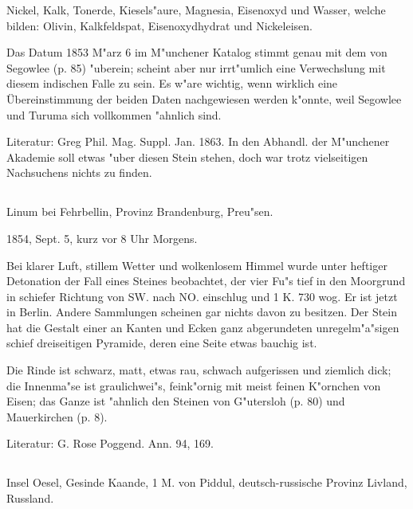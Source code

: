 \documentclass[a4paper, 11pt, oneside]{article}
\begin{document}
Nickel, Kalk, Tonerde, Kiesels"aure, Magnesia, Eisenoxyd und Wasser, welche bilden: Olivin, Kalkfeldspat, Eisenoxydhydrat und Nickeleisen.

Das Datum 1853 M"arz 6 im M"unchener Katalog stimmt genau mit dem von Segowlee (p. 85) "uberein; scheint aber nur irrt"umlich eine Verwechslung mit diesem indischen Falle zu sein. Es w"are wichtig, wenn wirklich eine Übereinstimmung der beiden Daten nachgewiesen werden k"onnte, weil Segowlee und Turuma sich vollkommen "ahnlich sind.

\normalsize
Literatur: Greg Phil. Mag. Suppl. Jan. 1863. In den Abhandl. der M"unchener Akademie soll etwas "uber diesen Stein stehen, doch war trotz vielseitigen Nachsuchens nichts zu finden.

\subsection{}
\LARGE
\paragraph{}
Linum bei Fehrbellin, Provinz Brandenburg, Preu"sen.

1854, Sept. 5, kurz vor 8 Uhr Morgens.

Bei klarer Luft, stillem Wetter und wolkenlosem Himmel wurde unter heftiger Detonation der Fall eines Steines beobachtet, der vier Fu"s tief in den Moorgrund in schiefer Richtung von SW. nach NO. einschlug und 1 K. 730 wog. Er ist jetzt in Berlin. Andere Sammlungen scheinen gar nichts davon zu besitzen. Der Stein hat die Gestalt einer an Kanten und Ecken ganz abgerundeten unregelm"a"sigen schief dreiseitigen Pyramide, deren eine Seite etwas bauchig ist.

Die Rinde ist schwarz, matt, etwas rau, schwach aufgerissen und ziemlich dick; die Innenma"se ist graulichwei"s, feink"ornig mit meist feinen K"ornchen von Eisen; das Ganze ist "ahnlich den Steinen von G"utersloh (p. 80) und Mauerkirchen (p. 8).

\normalsize
Literatur: G. Rose Poggend. Ann. 94, 169.

\subsection{}
\LARGE
\paragraph{}
Insel Oesel, Gesinde Kaande, 1 M. von Piddul, deutsch-russische Provinz Livland, Russland.
\end{document}
